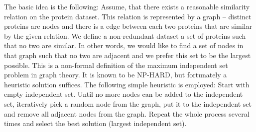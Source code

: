 \documentclass[11pt,twoside,a4paper]{book}
\begin{document}
The basic idea is the following: 
Assume, that there exists a reasonable similarity relation on the protein dataset. 
This relation is represented by a graph -- distinct proteins are nodes and there
is a edge between each two proteins that are similar by the given relation.
We define a non-redundant dataset a set of proteins such that no two are similar.
In other words, we would like to find a set of nodes in that graph such that no two are adjacent
and we prefer this set to be the largest possible.
This is a non-formal definition of the maximum independent set problem in graph theory.
It is known to be NP-HARD, but fortunately a heuristic solution suffices.
The following simple heuristic is employed:
Start with empty independent set.
Until no more nodes can be added to the independent set,
iteratively pick a random node from the graph,
put it to the independent set and remove all adjacent nodes from the graph.
Repeat the whole process several times and select the best solution (largest independent set).
\end{document}
